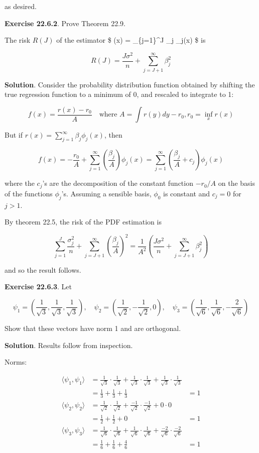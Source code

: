 as desired.

\textbf{Exercise 22.6.2}. Prove Theorem 22.9.

The risk \(R(J)\) of the estimator \$ (x) = \sum\_\{j=1\}\^{}J
\hat{\beta}\_j \phi\_j(x) \$ is

\[ R(J) = \frac{J \sigma^2}{n} + \sum_{j=J+1}^\infty \beta_j^2 \]

\textbf{Solution}. Consider the probability distribution function
obtained by shifting the true regression function to a minimum of 0, and
rescaled to integrate to 1:

\[ f(x) = \frac{r(x) - r_0}{A} \quad \text{where } A = \int r(y) dy - r_0, r_0 = \inf_x r(x) \]

But if \(r(x) = \sum_{j=1}^\infty \beta_j \phi_j(x)\), then

\[ f(x) = -\frac{r_0}{A} + \sum_{j=1}^\infty \left( \frac{\beta_j}{A} \right) \phi_j(x) = \sum_{j=1}^\infty \left( \frac{\beta_j}{A} + c_j \right) \phi_j(x) \]

where the \(c_j\)'s are the decomposition of the constant function
\(-r_0 / A\) on the basis of the functions \(\phi_j\)'s. Assuming a
sensible basis, \(\phi_0\) is constant and \(c_j = 0\) for \(j > 1\).

By theorem 22.5, the risk of the PDF estimation is

\[ \sum_{j=1}^J \frac{\sigma_j^2}{n} + \sum_{j=J+1}^\infty \left( \frac{\beta_j}{A} \right)^2 = \frac{1}{A^2} \left( \frac{J \sigma^2}{n} + \sum_{j=J+1}^\infty \beta_j^2 \right)\]

and so the result follows.

\textbf{Exercise 22.6.3}. Let

\[ \psi_1 = \left( \frac{1}{\sqrt{3}}, \frac{1}{\sqrt{3}} , \frac{1}{\sqrt{3}} \right),
\quad
\psi_2 = \left( \frac{1}{\sqrt{2}}, -\frac{1}{\sqrt{2}} , 0 \right),
\quad
\psi_3 = \left( \frac{1}{\sqrt{6}}, \frac{1}{\sqrt{6}} , -\frac{2}{\sqrt{6}} \right)
\]

Show that these vectors have norm 1 and are orthogonal.

\textbf{Solution}. Results follow from inspection.

Norms:

\[
\begin{align}
\langle \psi_1, \psi_1 \rangle &= \frac{1}{\sqrt{3}} \cdot \frac{1}{\sqrt{3}} + \frac{1}{\sqrt{3}} \cdot \frac{1}{\sqrt{3}} + \frac{1}{\sqrt{3}} \cdot \frac{1}{\sqrt{3}} \\&= \frac{1}{3} + \frac{1}{3} + \frac{1}{3} &= 1 \\
\langle \psi_2, \psi_2 \rangle &= \frac{1}{\sqrt{2}} \cdot \frac{1}{\sqrt{2}} + \frac{-1}{\sqrt{2}} \cdot \frac{-1}{\sqrt{2}} + 0 \cdot 0 \\&= \frac{1}{2} + \frac{1}{2} + 0 &= 1 \\
\langle \psi_3, \psi_3 \rangle &= \frac{1}{\sqrt{6}} \cdot \frac{1}{\sqrt{6}} + \frac{1}{\sqrt{6}} \cdot \frac{1}{\sqrt{6}} + \frac{-2}{\sqrt{6}} \cdot \frac{-2}{\sqrt{6}}\\ &= \frac{1}{6} + \frac{1}{6} + \frac{4}{6} &= 1
\end{align}
\]


